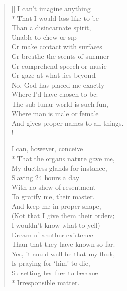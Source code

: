 \documentclass[MAIN]{subfiles}
\begin{document}
\settowidth{\versewidth}{The sub-lunar world is such fun,}
\begin{verse}[\versewidth]
I can't imagine anything\\*
\vin That I would less like to be\\
Than a disincarnate spirit,\\
\vin Unable to chew or sip\\
Or make contact with surfaces\\
\vin Or breathe the scents of summer\\
Or comprehend speech or music\\
\vin Or gaze at what lies beyond.\\
No, God has placed me exactly\\
\vin Where I'd have chosen to be:\\
The sub-lunar world is such fun,\\
\vin Where man is male or female\\
And gives proper names to all things.\\!

\vin I can, however, conceive\\*
That the organs nature gave me,\\
\vin My ductless glands for instance,\\
Slaving 24 hours a day\\
\vin With no show of resentment\\
To gratify me, their master,\\
\vin And keep me in proper shape,\\
(Not that I give them their orders;\\
\vin I wouldn't know what to yell)\\
Dream of another existence\\
\vin Than that they have known so far.\\
Yes, it could well be that my flesh,\\
\vin Is praying for `him' to die,\\
So setting her free to become\\*
\vin Irresponsible matter.
\end{verse}
\end{document}
